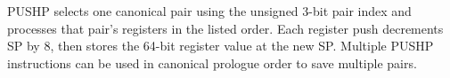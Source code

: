 PUSHP selects one canonical pair using the unsigned 3-bit pair index and processes that pair's registers in the listed order. Each register push decrements SP by 8, then stores the 64-bit register value at the new SP. Multiple PUSHP instructions can be used in canonical prologue order to save multiple pairs.
